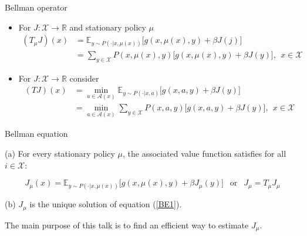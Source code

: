 \documentclass{beamer}
\def\R{{\mathbb R}}
\def\X{{\mathcal X}}
\def\E{{\mathbb E}}
\def\A{{\mathcal A}}
\newcommand{\place}[2]{%
  \overset{\substack{#1\\\smile}}{#2}%
}
\begin{document}
\begin{frame}{Bellman operator}
\begin{itemize}
\item For  $J:\X\rightarrow \R$ and stationary policy $\mu$
\begin{align*}
(T_\mu J)(x) &= \E_{y\sim P(\cdot|x, \mu(x))}\Big[ g(x, \mu(x), y) +\beta J(j) \Big]\\
&=\sum\limits_{y\in \X}P(x, \mu(x), y)\Big[ g(x, \mu(x), y) +\beta J(y) \Big], ~~x\in \X
\end{align*}

  \item For  $J:\X\rightarrow \R$ consider
\begin{align*}
(TJ)(x) &= \min\limits_{a\in \A(x)} \E_{y\sim P(\cdot|x, a)}\Big[ g(x, a,y) +\beta J(y) \Big]\\
&=\min\limits_{a\in \A(x)} \sum\limits_{y\in \X}P(x, a, y)\Big[ g(x, a, y) +\beta J(y) \Big],~~x\in \X
\end{align*}





% 
  
\end{itemize}
\end{frame}



\begin{frame}{Bellman equation}

\begin{theorem}
(a) For every stationary policy $\mu$, the associated value function satisfies for all $i\in \X$:


\begin{equation*}\label{BE1}
J_\mu(x) = \E_{y\sim P(\cdot|x, \mu(x))} \Big[g(x, \mu(x), y) +\beta J_\mu(y) \Big] ~~\text{ or }~~J_{\mu} = T_\mu J_\mu
\end{equation*}

(b) $J_\mu$ is the unique solution of equation (\ref{BE1}).
\end{theorem}


\begin{center}
The main purpose of this talk is to find an efficient way to estimate $J_\mu$.
\end{center}

\end{frame}
\end{document}
